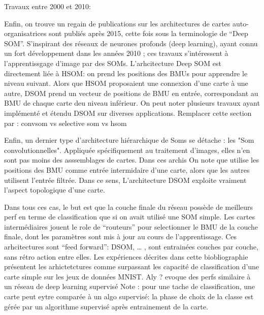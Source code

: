 \documentclass[../main]{subfiles}
\begin{document}
Travaux entre 2000 et 2010:
\cite{suganthan_pattern_2001,dittenbach_growing_2000,yamaguchi_adaptive_2010,ordonez_hierarchical_2010,barbalho_hierarchical_2001,gunes_kayacik_hierarchical_2007,wang_comparisonal_2007}


Enfin, on trouve un regain de publications sur les architectures de cartes auto-organisatrices sont publiés après 2015, cette fois sous la terminologie de “Deep SOM”. S'inspirant des réseaux de neurones profonds (deep learning), ayant connu un fort développement dans les années 2010 \cite{lecun_deep_2015}; ces travaux s'intéressent à l'apprentissgage d'image par des SOMs. 
\cite{Liu2015DeepSM,hankins_somnet_2018,wickramasinghe_deep_2019,aly_deep_2020,sakkari_convolutional_2020,dozono_convolutional_2016,nawaratne_hierarchical_2020,mici_self-organizing_2018}
L'arhcitecture Deep SOM est directement liée à HSOM: on prend les positions des BMUs pour apprendre le niveau suivant. Alors que HSOM proposaient une connexion d’une carte à une autre, DSOM prend un vecteur de positions de BMU en entrée, correspondant au BMU de chaque carte deu niveau inférieur.
On peut noter plusieurs travaux ayant implémenté et étendu DSOM sur diverses applications.
Remplacer cette section par : convsom vs selective som vs hsom

Enfin, un dernier type d'architecture hiérarchique de Soms se détache : les "Som convolutionnelles". Appliquée spécifiquement au traitement d'images, elles n'en sont pas moins des asssemblages de cartes. Dans ces archis \cite{Liu2015DeepSM,dozono_convolutional_2016}
On note que \cite{Liu2015DeepSM} utilise les positions des BMU comme entrée intermidaire d'une carte, alors que les autres utilisent l'entrée filtrée. Dans ce sens, L'architecture DSOM exploite vraiment l'aspect topologique d'une carte.

Dans tous ces cas, le but est que la couche finale du réseau possède de meilleurs perf en terme de classification que si on avait utilisé une SOM simple. Les cartes intermédiaires jouent le role de “routeurs” pour selectionner le BMU de la couche finale,  dont les paramètres sont mis à jour au cours de l'apprentissage.
Ces arhcitectures sont “feed forward”: DSOM, … , sont entrainées couches par couche, sans rétro action entre elles. 
Les expériences décrites dans cette biobliographie présentent les arhictetctures comme surpassant les capacité de classification d'une carte simple sur les jeux de données MNIST.
Aly ? evoque des perfs similaire à un réseau de deep learning supervisé
Note : pour une tache de classification, une carte peut eytre comparée à un algo supervisé: la phase de choix de la classe est gérée par un algorithme supervisé après entrainement de la carte.
\end{document}
